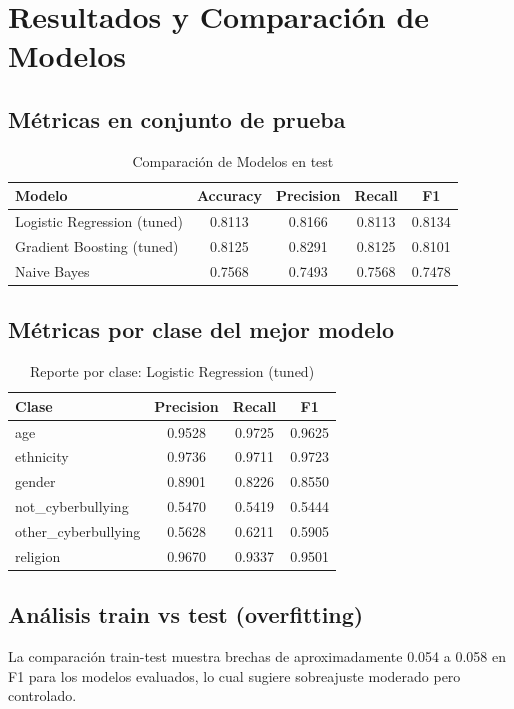﻿\documentclass[12pt,a4paper]{article}
\begin{document}
\section{Resultados y Comparación de Modelos}
\subsection{Métricas en conjunto de prueba}

\begin{table}[H]
\centering
\caption{Comparación de Modelos en test}
\begin{tabular}{lcccc}
\toprule
Modelo & Accuracy & Precision & Recall & F1 \\
\midrule
Logistic Regression (tuned) & 0.8113 & 0.8166 & 0.8113 & 0.8134 \\
Gradient Boosting (tuned)   & 0.8125 & 0.8291 & 0.8125 & 0.8101 \\
Naive Bayes                 & 0.7568 & 0.7493 & 0.7568 & 0.7478 \\
\bottomrule
\end{tabular}
\end{table}

\subsection{Métricas por clase del mejor modelo}

\begin{table}[H]
\centering
\caption{Reporte por clase: Logistic Regression (tuned)}
\begin{tabular}{lccc}
\toprule
Clase & Precision & Recall & F1 \\
\midrule
age                 & 0.9528 & 0.9725 & 0.9625 \\
ethnicity           & 0.9736 & 0.9711 & 0.9723 \\
gender              & 0.8901 & 0.8226 & 0.8550 \\
not\_cyberbullying  & 0.5470 & 0.5419 & 0.5444 \\
other\_cyberbullying& 0.5628 & 0.6211 & 0.5905 \\
religion            & 0.9670 & 0.9337 & 0.9501 \\
\bottomrule
\end{tabular}
\end{table}

\subsection{Análisis train vs test (overfitting)}
La comparación train-test muestra brechas de aproximadamente 0.054 a 0.058 en F1 para los modelos evaluados,
lo cual sugiere sobreajuste moderado pero controlado.
\end{document}

